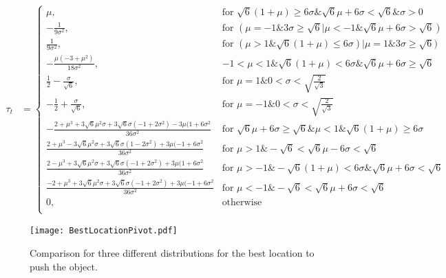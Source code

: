 \begin{strip}
\begin{align}
\tau_t &=  \left\{
\begin{array}{ll}
    \mu, &   \textrm{for     }\sqrt{6}(1+\mu)\geq 6\sigma \& \sqrt{6}\mu + 6 \sigma < \sqrt{6} \& \sigma>0\\
     -\frac{1}{9\sigma^2},   & \textrm{for     } (\mu=-1\&3\sigma \geq \sqrt{6} | \mu <-1 \& \sqrt{6}\mu+6\sigma > \sqrt{6})\\
   \frac{1}{9\sigma^2}, & \textrm{for     } (\mu>1\&\sqrt{6}(1+\mu) \leq 6\sigma) | \mu =1 \& 3\sigma \geq \sqrt{6})\\
    -\frac{\mu(-3+\mu^2)}{18\sigma^2}, & -1<\mu<1 \& \sqrt{6}(1+\mu) <6\sigma \& \sqrt{6}\mu + 6\sigma\geq\sqrt{6}\\
    \frac{1}{2}-\frac{\sigma}{\sqrt{6}}, & \textrm{for     } \mu = 1 \& 0< \sigma < \sqrt{\frac{2}{\sqrt{3}}}\\
    -\frac{1}{2}+\frac{\sigma}{\sqrt{6}}, & \textrm{for     } \mu = -1 \&0< \sigma < \sqrt{\frac{2}{\sqrt{3}}}\\
    -\frac{2+\mu^3+3\sqrt{6}\mu^2\sigma+3\sqrt{6}\sigma(-1+2\sigma^2)-3\mu(1+6\sigma^2}{36\sigma^2} &  \textrm{for     }  \sqrt{6} \mu+6\sigma\geq\sqrt{6}\&\mu<1\&\sqrt{6}(1+\mu)\geq 6\sigma\\
   \frac{2+\mu^3-3\sqrt{6}\mu^2\sigma+3\sqrt{6}\sigma(1-2\sigma^2)+3\mu(-1+6\sigma^2}{36\sigma^2} &  \textrm{for     } \mu>1 \& -\sqrt{6}< \sqrt{6}\mu-6\sigma< \sqrt{6} \\
     \frac{2-\mu^3+3\sqrt{6}\mu^2\sigma+3\sqrt{6}\sigma(-1+2\sigma^2)+3\mu(1+6\sigma^2}{36\sigma^2} &  \textrm{for     } \mu>-1 \& -\sqrt{6}(1+\mu)<6\sigma\& \sqrt{6}\mu+6\sigma< \sqrt{6} \\
     \frac{-2+\mu^3+3\sqrt{6}\mu^2\sigma+3\sqrt{6}\sigma(-1+2\sigma^2)+3\mu(-1+6\sigma^2}{36\sigma^2} &  \textrm{for     } \mu<-1 \& -\sqrt{6}< \sqrt{6}\mu+6\sigma< \sqrt{6} \\
     0, &  \textrm{otherwise}\\
\end{array} 
\right.
\end{align}
\end{strip}







\begin{figure}
\begin{center}
	\texttt{[image: BestLocationPivot.pdf]}
\end{center}
\vspace{-1em}
\caption{\label{fig:besLocPiv}
Comparison for three different distributions for the best location to push the object.
}
\vspace{0em}
\end{figure}



